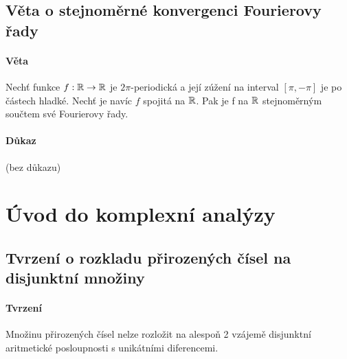 \documentclass[a4paper,10pt]{article}
\begin{document}
\subsection{Věta o stejnoměrné konvergenci Fourierovy řady}
\setcounter{equation}{0}
\paragraph{Věta}
Nechť funkce $f : \mathbb{R} \to \mathbb{R}$ je $2\pi$-periodická a její zúžení na interval
$[\pi,-\pi]$ je po částech hladké. Nechť je navíc $f$ spojitá na $\mathbb{R}$. Pak je f
na $\mathbb{R}$ stejnoměrným součtem své Fourierovy řady.
\paragraph{Důkaz}
(bez důkazu)





\section{Úvod do komplexní analýzy}
\setcounter{equation}{0}

\subsection{Tvrzení o rozkladu přirozených čísel na disjunktní množiny}
\setcounter{equation}{0}
\paragraph{Tvrzení}
Množinu přirozených čísel nelze rozložit na alespoň 2 vzájemě disjunktní aritmetické
posloupnosti s unikátními diferencemi.
\end{document}
